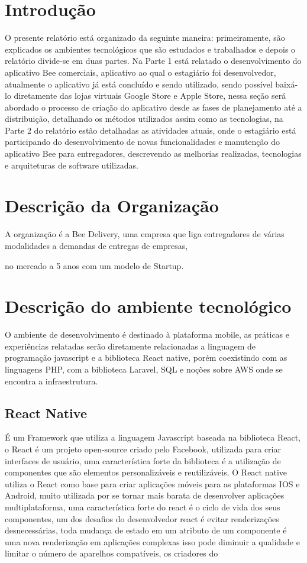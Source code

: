 \documentclass{ufersa}
\begin{document}
\section{Introdução}

O presente relatório está organizado da seguinte maneira: primeiramente, são explicados os ambientes tecnológicos que são estudados e trabalhados e depois o relatório divide-se em duas partes. Na Parte 1 está relatado o desenvolvimento do aplicativo Bee comerciais, aplicativo ao qual o estagiário foi desenvolvedor, atualmente o aplicativo já está concluído e sendo utilizado, sendo possível baixá-lo diretamente das lojas virtuais Google Store e Apple Store, nessa seção será abordado o processo de criação do aplicativo desde as fases de planejamento até a distribuição, detalhando os métodos utilizados assim como as tecnologias, na Parte 2 do relatório estão detalhadas as atividades atuais, onde o estagiário está participando do desenvolvimento de novas funcionalidades e manutenção do aplicativo Bee para entregadores, descrevendo as melhorias realizadas, tecnologias e arquiteturas de software utilizadas.  

\section{Descrição da Organização}

A organização é a Bee Delivery, uma empresa que liga entregadores de várias modalidades a demandas de entregas de empresas, 

no mercado a 5 anos com um modelo de Startup.

\section{Descrição do ambiente tecnológico}

O ambiente de desenvolvimento é destinado à plataforma mobile, as práticas e experiências relatadas serão diretamente relacionadas a linguagem de programação javascript e a biblioteca React native, porém coexistindo com as linguagens PHP, com a biblioteca Laravel, SQL e noções sobre AWS onde se encontra a infraestrutura.

\subsection{React Native}

É um Framework que utiliza a linguagem Javascript baseada na biblioteca React, o React é um projeto open-source criado pelo Facebook, utilizada para criar interfaces de usuário, uma característica forte da biblioteca é a utilização de componentes que são elementos personalizáveis e reutilizáveis. O React native utiliza o React como base para criar aplicações móveis para as plataformas IOS e Android, muito utilizada por se tornar mais barata de desenvolver aplicações multiplataforma, uma característica forte do react é o ciclo de vida dos seus componentes, um dos desafios do desenvolvedor react é evitar renderizações desnecessárias, toda mudança de estado em um atributo de um componente é uma nova renderização em aplicações complexas isso pode diminuir a qualidade e limitar o número de aparelhos compatíveis, os criadores do 
\end{document}

